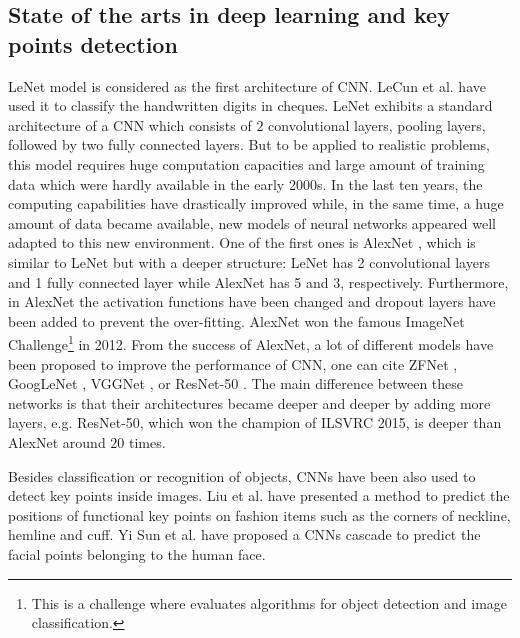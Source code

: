 \documentclass[review]{elsarticle}
\begin{document}
\subsection{State of the arts in deep learning and key points detection}
LeNet \cite{lecun1998gradient} model is considered as the first
architecture of CNN. LeCun et al. \cite{lecun1998gradient} have used
it to classify the handwritten digits in cheques. LeNet exhibits a
standard architecture of a CNN which consists of $2$ convolutional
layers, pooling layers, followed by two fully connected layers. But to
be applied to realistic problems, this model requires huge computation
capacities and large amount of training data which were hardly
available in the early 2000s. In the last ten years, the computing
capabilities have drastically improved while, in the same time, a huge
amount of data became available, new models of neural networks
appeared well adapted to this new environment. One of the first ones
is AlexNet \cite{krizhevsky2012imagenet}, which is similar to LeNet
\cite{lecun1998gradient} but with a deeper structure: LeNet has 2
convolutional layers and 1 fully connected layer while AlexNet has 5
and 3, respectively. Furthermore, in AlexNet the activation functions
have been changed and dropout layers have been added to prevent the
over-fitting. AlexNet won the famous ImageNet Challenge\footnote{This
  is a challenge where evaluates algorithms for object detection and
  image classification.} in 2012. From the success of AlexNet, a lot
of different models have been proposed to improve the performance of
CNN, one can cite ZFNet  \cite{zeiler2014visualizing}, GoogLeNet
\cite{szegedy2015going}, VGGNet \cite{simonyan2014very}, or ResNet-50
\cite{he2016deep}. The main difference between these networks is that
their architectures became deeper and deeper by adding more layers,
e.g. ResNet-50, which won the champion of ILSVRC 2015, is deeper than
AlexNet around $20$ times.

 
Besides classification or recognition of objects, CNNs have been also
used to detect key points inside images. Liu et
al. \cite{liu2016fashion} have presented a method to predict the
positions of functional key points on fashion items such as the
corners of neckline, hemline and cuff. Yi Sun et
al. \cite{sun2013deep} have proposed a CNNs cascade to predict the
facial points belonging to the human face.
\end{document}
